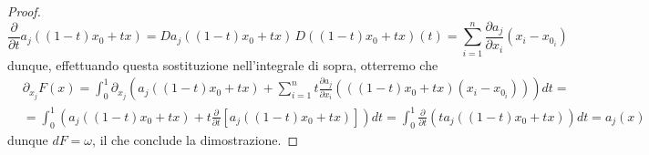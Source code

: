 \begin{proof}
	$$
		\frac{\partial}{\partial t} a_j((1-t)x_0 + tx) = Da_j((1-t)x_0 + tx) \, D((1-t)x_0 + tx)(t) = \sum_{i=1}^n \frac{\partial a_j}{\partial x_i}(x_i - x_{0_i})
	$$
	dunque, effettuando questa sostituzione nell'integrale di sopra, otterremo che
	\begin{align*}
	&\partial_{x_j} F(x) = \int_0^1 \partial_{x_j} \left(a_j((1-t)x_0 + tx) + \sum_{i=1}^n t\frac{\partial a_j}{\partial x_i} \left( ((1-t)x_0 + tx) (x_i - x_{0_i}) \right) \right) dt = \\
	&=\int_0^1 \left( a_j((1-t)x_0 + tx) + t\frac{\partial}{\partial t} \left[ a_j((1-t)x_0 + tx) \right] \right)dt = \int_0^1 \frac{\partial}{\partial t} \left( ta_j((1-t)x_0 + tx) \right)dt = a_j(x) 
	\end{align*}
	dunque $dF=\omega$, il che conclude la dimostrazione.
\end{proof}

